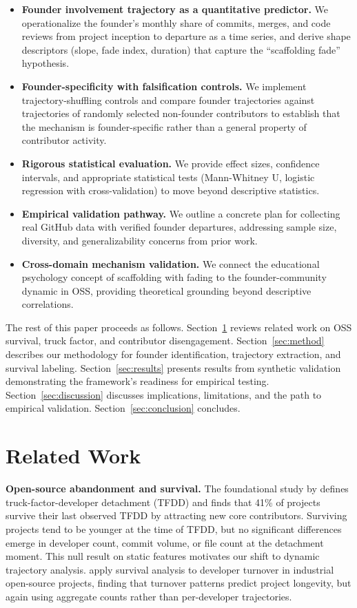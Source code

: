 \documentclass[11pt,letterpaper]{article}
\begin{document}
\begin{itemize}
  \item \textbf{Founder involvement trajectory as a quantitative predictor.} We operationalize the founder's monthly share of commits, merges, and code reviews from project inception to departure as a time series, and derive shape descriptors (slope, fade index, duration) that capture the ``scaffolding fade'' hypothesis.
  \item \textbf{Founder-specificity with falsification controls.} We implement trajectory-shuffling controls and compare founder trajectories against trajectories of randomly selected non-founder contributors to establish that the mechanism is founder-specific rather than a general property of contributor activity.
  \item \textbf{Rigorous statistical evaluation.} We provide effect sizes, confidence intervals, and appropriate statistical tests (Mann-Whitney U, logistic regression with cross-validation) to move beyond descriptive statistics.
  \item \textbf{Empirical validation pathway.} We outline a concrete plan for collecting real GitHub data with verified founder departures, addressing sample size, diversity, and generalizability concerns from prior work.
  \item \textbf{Cross-domain mechanism validation.} We connect the educational psychology concept of scaffolding with fading to the founder-community dynamic in OSS, providing theoretical grounding beyond descriptive correlations.
\end{itemize}

The rest of this paper proceeds as follows. Section~\ref{sec:related} reviews related work on OSS survival, truck factor, and contributor disengagement. Section~\ref{sec:method} describes our methodology for founder identification, trajectory extraction, and survival labeling. Section~\ref{sec:results} presents results from synthetic validation demonstrating the framework's readiness for empirical testing. Section~\ref{sec:discussion} discusses implications, limitations, and the path to empirical validation. Section~\ref{sec:conclusion} concludes.

\section{Related Work}
\label{sec:related}

\textbf{Open-source abandonment and survival.} The foundational study by \citet{Avelino2019} defines truck-factor-developer detachment (TFDD) and finds that 41\% of projects survive their last observed TFDD by attracting new core contributors. Surviving projects tend to be younger at the time of TFDD, but no significant differences emerge in developer count, commit volume, or file count at the detachment moment. This null result on static features motivates our shift to dynamic trajectory analysis. \citet{Kamei2022} apply survival analysis to developer turnover in industrial open-source projects, finding that turnover patterns predict project longevity, but again using aggregate counts rather than per-developer trajectories.
\end{document}
